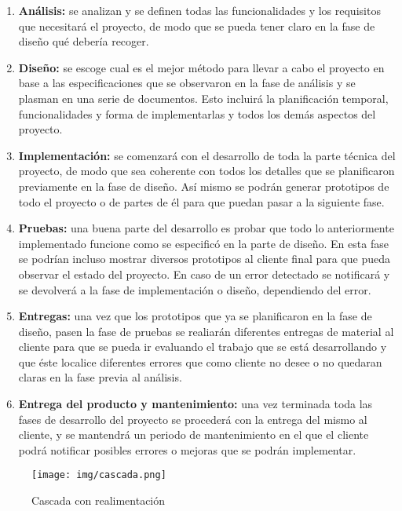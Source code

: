 \documentclass[palatino]{apuntes}
\begin{document}
\begin{enumerate}
	\item \textbf{Análisis:} se analizan y se definen todas las funcionalidades y los requisitos que necesitará el proyecto, de modo que se pueda tener claro en la fase de diseño qué debería recoger.
	\item \textbf{Diseño:} se escoge cual es el mejor método para llevar a cabo el proyecto en base a las especificaciones que se observaron en la fase de análisis y se plasman en una serie de documentos. Esto incluirá  la planificación temporal, funcionalidades y forma de implementarlas y todos los demás aspectos del proyecto.
	\item \textbf{Implementación:} se comenzará con el desarrollo de toda la parte técnica del proyecto, de modo que sea coherente con todos los detalles que se planificaron previamente en la fase de diseño. Así mismo se podrán generar prototipos de todo el proyecto o de partes de él para que puedan pasar a la siguiente fase.
	\item \textbf{Pruebas:} una buena parte del desarrollo es probar que todo lo anteriormente implementado funcione como se especificó en la parte de diseño. En esta fase se podrían incluso mostrar diversos prototipos al cliente final para que pueda observar el estado del proyecto. En caso de un error detectado se notificará y se devolverá a la fase de implementación o diseño, dependiendo del error.
	\item \textbf{Entregas:} una vez que los prototipos que ya se planificaron en la fase de diseño, pasen la fase de pruebas se realiarán diferentes entregas de material al cliente para que se pueda ir evaluando el trabajo que se está desarrollando y que éste localice diferentes errores que como cliente no desee o no quedaran claras en la fase previa al análisis.
	\item \textbf{Entrega del producto y mantenimiento:} una vez terminada toda las fases de desarrollo del proyecto se procederá con la entrega del mismo al cliente, y se mantendrá un periodo de mantenimiento en el que el cliente podrá notificar posibles errores o mejoras que se podrán implementar.
\end{enumerate}

\begin{figure}[hbtp]
    \centering
    \texttt{[image: img/cascada.png]}
    \caption{Cascada con realimentación}
    \label{fig:cascadarealimentacion}
\end{figure}
\end{document}
